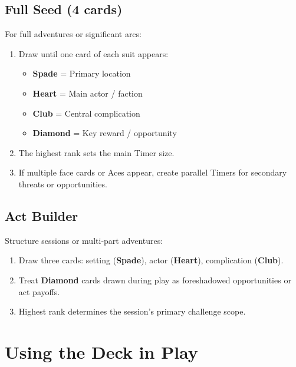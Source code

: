 \subsection{Full Seed (4 cards)}\label{subsec:full_seed}
For full adventures or significant arcs:
\begin{enumerate}
    \item Draw until one card of each suit appears:
        \begin{itemize}
            \item \textbf{Spade} = Primary location 
            \item \textbf{Heart} = Main actor / faction 
            \item \textbf{Club} = Central complication 
            \item \textbf{Diamond} = Key reward / opportunity 
        \end{itemize}
    \item The highest rank sets the main Timer size.
    \item If multiple face cards or Aces appear, create parallel Timers for secondary threats or opportunities.
\end{enumerate}

\subsection{Act Builder}\label{subsec:act_builder}
Structure sessions or multi‑part adventures:
\begin{enumerate}
    \item Draw three cards: setting (\textbf{Spade}), actor (\textbf{Heart}), complication (\textbf{Club}).
    \item Treat \textbf{Diamond} cards drawn during play as foreshadowed opportunities or act payoffs.
    \item Highest rank determines the session's primary challenge scope.
\end{enumerate}

\section{Using the Deck in Play}\label{sec:deck_in_play}

